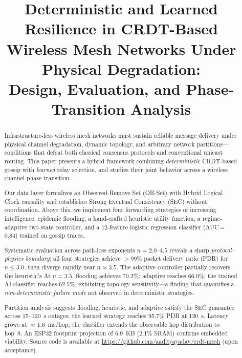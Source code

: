 \documentclass[conference]{IEEEtran}
\begin{document}
\title{Deterministic and Learned Resilience in CRDT-Based\\
       Wireless Mesh Networks Under Physical Degradation:\\
       Design, Evaluation, and Phase-Transition Analysis}

\author{
}
\maketitle

\begin{abstract}
Infrastructure-less wireless mesh networks must sustain reliable message
delivery under physical channel degradation, dynamic topology, and arbitrary
network partitions---conditions that defeat both classical consensus protocols
and conventional unicast routing.  This paper presents a hybrid framework
combining \emph{deterministic} CRDT-based gossip with \emph{learned} relay
selection, and studies their joint behavior across a wireless channel phase
transition.

Our data layer formalizes an Observed-Remove Set (OR-Set) with Hybrid Logical
Clock causality and establishes Strong Eventual Consistency (SEC) without
coordination.  Above this, we implement four forwarding strategies of increasing
intelligence: epidemic flooding, a hand-crafted heuristic utility function, a
regime-adaptive two-state controller, and a 12-feature logistic regression
classifier (AUC\,=\,0.84) trained on gossip traces.

Systematic evaluation across path-loss exponents $n = 2.0$--$4.5$ reveals a
sharp \emph{protocol--physics boundary}: all four strategies achieve $>$99\%
packet delivery ratio (PDR) for $n \leq 3.0$, then diverge rapidly near
$n \approx 3.5$.  The adaptive controller partially recovers the heuristic's
At $n=3.5$, flooding achieves 70.2\%; adaptive reaches 66.0\%; the trained AI classifier reaches 62.5\%, exhibiting topology-sensitivity---a finding that quantifies a \emph{non-deterministic failure mode} not observed in deterministic strategies.

Partition analysis suggests flooding, heuristic, and adaptive satisfy the SEC
guarantee across 15--120~s outages; the learned strategy reaches 95.7\% PDR at 120~s.  Latency grows at $\approx$1.6~ms/hop; the classifier extends the observable hop distribution to hop~8.  An ESP32 footprint projection of
6.9~KB (2.1\% SRAM) confirms embedded viability.  Source code is available at
\url{https://github.com/aadityayadav/crdt-mesh} (upon acceptance).
\end{abstract}
\end{document}
